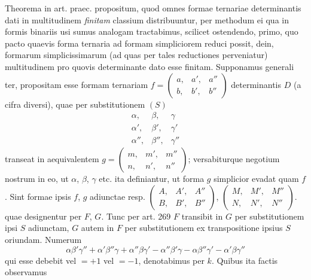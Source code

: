 Theorema in art. praec. propositum, quod omnes formae ternariae determinantis dati in multitudinem \emph{finitam} classium distribuuntur, per methodum ei qua in formis binariis usi sumus analogam tractabimus, scilicet ostendendo, primo, quo pacto quaevis forma ternaria ad formam simpliciorem reduci possit, dein, formarum simplicissimarum (ad quas per tales reductiones perveniatur) multitudinem pro quovis determinante dato esse finitam. Supponamus generali%
%
ter, propositam esse formam ternariam \(f=\left(\begin{smallmatrix}a,&a',&a''\\b,&b',&b''\end{smallmatrix}\right)\) determinantis \(D\) (a cifra diversi), quae per substitutionem \((S)\)
\[
\begin{array}{ccc}
\alpha,&\beta,&\gamma\\
\alpha',&\beta',&\gamma'\\
\alpha'',&\beta'',&\gamma''
\end{array}
\]
transeat in aequivalentem \(g=\left(\begin{smallmatrix}m,&m',&m''\\n,&n',&n''\end{smallmatrix}\right)\); versabiturque negotium nostrum in eo, ut \(\alpha\), \(\beta\), \(\gamma\) etc. ita definiantur, ut forma \(g\) simplicior evadat quam \(f\). Sint formae ipsis \(f\), \(g\) adiunctae resp. \(\left(\begin{smallmatrix}A,&A',&A''\\B,&B',&B''\end{smallmatrix}\right)\), \(\left(\begin{smallmatrix}M,&M',&M''\\N,&N',&N''\end{smallmatrix}\right)\). quae designentur per \(F\), \(G\). Tunc per art. 269 \(F\) transibit in \(G\) per substitutionem ipsi \(S\) adiunctam, \(G\) autem in \(F\) per substitutionem ex transpositione ipsius \(S\) oriundam. Numerum
\[
\alpha\beta'\gamma''+\alpha'\beta''\gamma+\alpha''\beta\gamma'-\alpha''\beta'\gamma-\alpha\beta''\gamma'-\alpha'\beta\gamma''
\]
qui esse debebit vel \(=+1\) vel \(=-1\), denotabimus per \(k\). Quibus ita factis observamus

